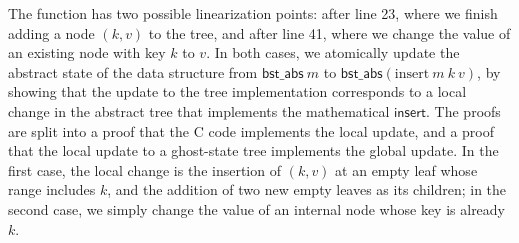 \documentclass[runningheads]{llncs}
\newcommand{\treerep}{\ensuremath{\mathsf{bst\_abs}}}
\begin{document}
The function has two possible linearization points: after line 23, where we finish adding a node $(k, v)$ to the tree, and after line 41, where we change the value of an existing node with key $k$ to $v$. In both cases, we atomically update the abstract state of the data structure from $\treerep\ m$ to $\treerep (\mathrm{insert}\ m\ k\ v)$, by showing that the update to the tree implementation corresponds to a local change in the abstract tree that implements the mathematical $\mathsf{insert}$. The proofs are split into a proof that the C code implements the local update, and a proof that the local update to a ghost-state tree implements the global update. In the first case, the local change is the insertion of $(k, v)$ at an empty leaf whose range includes $k$, and the addition of two new empty leaves as its children; in the second case, we simply change the value of an internal node whose key is already $k$. 
  
\end{document}
